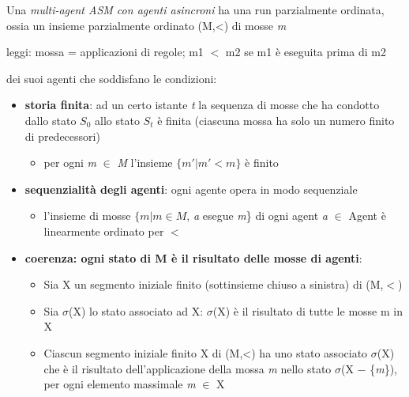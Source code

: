 \noindent Una \textit{multi-agent ASM con agenti asincroni} ha una run parzialmente ordinata, ossia un insieme
parzialmente ordinato (M,<) di mosse \textit{m} 
\begin{center}
    leggi: mossa = applicazioni di regole; m1 $<$ m2 se m1 è eseguita prima di m2
\end{center} 
\noindent dei suoi agenti che soddisfano le condizioni:
\begin{itemize}
    \item \textbf{storia finita}: ad un certo istante \textit{t}  la sequenza di mosse che
    ha condotto dallo stato $S_0$ allo stato $S_t$ è finita (ciascuna mossa ha solo un numero finito di
    predecessori)
    \begin{itemize}
        \item per ogni \textit{m} $\in$ \textit{M} l'insieme $\{m' | m' < m\}$ è finito
    \end{itemize}
    \item \textbf{ sequenzialità degli agenti}: ogni agente opera in modo sequenziale
    \begin{itemize}
        \item l'insieme di mosse $\{m | m \in M $, \textit{a} esegue \textit{m}\} di ogni agent \textit{a} $\in$ Agent è linearmente ordinato per $<$
    \end{itemize}
    \item \textbf{ coerenza: ogni stato di M è il risultato delle mosse di agenti}: 
    \begin{itemize}
        \item Sia X un segmento iniziale finito (sottinsieme chiuso a sinistra) di (M,$<$)
        \item Sia $\sigma$(X) lo stato associato ad X: $\sigma$(X) è il risultato di tutte le mosse m in X  
        \item Ciascun segmento iniziale finito X di (M,<) ha uno stato associato $\sigma$(X) che è il risultato dell'applicazione della mossa \textit{m} nello stato $\sigma$(X $-$ \{\textit{m}\}), per ogni elemento massimale \textit{m} $\in$ X 
    \end{itemize}
\end{itemize}
